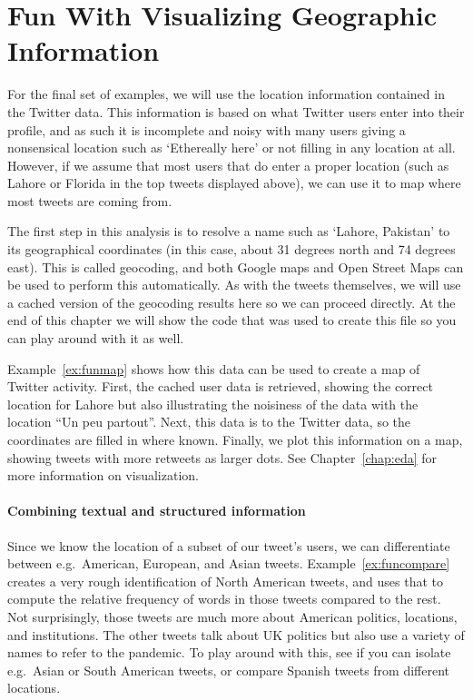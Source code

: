 
\section{Fun With Visualizing Geographic Information}\label{sec:fungeo}
For the final set of examples, we will use the location information contained in the Twitter data.
This information is based on what Twitter users enter into their profile, and as such it is incomplete and noisy
with many users giving a nonsensical location such as `Ethereally here' or not filling in any location at all.
However, if we assume that most users that do enter a proper location (such as Lahore or Florida in the top tweets displayed above),
we can use it to map where most tweets are coming from.

The first step in this analysis is to resolve a name such as `Lahore, Pakistan' to its geographical coordinates (in this case, about 31 degrees north and 74 degrees east). This is called geocoding, and both Google maps and Open Street Maps can be used
to perform this automatically.
As with the tweets themselves, we will use a cached version of the geocoding results here so we can proceed directly.
At the end of this chapter we will show the code that was used to create this file so you can play around with it as well. 

Example~\ref{ex:funmap} shows how this data can be used to create a map of Twitter activity.
First, the cached user data is retrieved, showing the correct location for Lahore but also
illustrating the noisiness of the data with the location ``Un peu partout''.
Next, this data is  to the Twitter data, so the coordinates are filled in where known.
Finally, we plot this information on a map, showing tweets with more retweets as larger dots.
See Chapter~\ref{chap:eda} for more information on visualization.



\paragraph{Combining textual and structured information}
Since we know the location of a subset of our tweet's users,
we can differentiate between e.g.\ American, European, and Asian tweets.
Example~\ref{ex:funcompare} creates a very rough identification of North American tweets,
and uses that to compute the relative frequency of words in those tweets compared to the rest.
Not surprisingly, those tweets are much more about American politics, locations, and institutions.
The other tweets talk about UK politics but also use a variety of names to refer to the pandemic.
To play around with this, see if you can isolate e.g.\ Asian or South American tweets,
or compare Spanish tweets from different locations.


